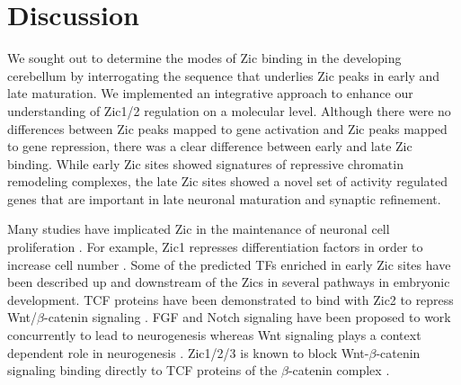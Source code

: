 \documentclass[fleqn,10pt]{wlscirep}
\begin{document}
\section*{Discussion}
We sought out to determine the modes of Zic binding in the developing cerebellum by interrogating the sequence that underlies Zic peaks in early and late maturation. We implemented an integrative approach to enhance our understanding of Zic1/2 regulation on a molecular level. Although there were no differences between Zic peaks mapped to gene activation and Zic peaks mapped to gene repression, there was a clear difference between early and late Zic binding. While early Zic sites showed signatures of repressive chromatin remodeling complexes, the late Zic sites showed a novel set of activity regulated genes that are important in late neuronal maturation and synaptic refinement. 



Many studies have implicated Zic in the maintenance of neuronal cell proliferation \cite{ Lim2007Zic3Cells, Janesick2013ERFNeurogenesis, Aruga2002Zic1Differentiation, Ebert2003Zic1Autoregulation }. For example, Zic1 represses differentiation factors in order to increase cell number \cite{Aruga2002Zic1Differentiation}. Some of the predicted TFs enriched in early Zic sites have been described up and downstream of the Zics in several pathways in embryonic development. TCF proteins have been demonstrated to bind with Zic2 to repress  Wnt/$\beta$-catenin signaling \cite{Aruga2018Zic1, Lowenstein2021Olig3Development}. FGF and Notch signaling have been proposed to work concurrently to lead to neurogenesis \cite{Voelkel2014FGFHierarchy} whereas Wnt signaling plays a context dependent role in neurogenesis \cite{Lassiter2014SignalingDelamination}. Zic1/2/3 is known to block Wnt-$\beta$-catenin signaling binding directly to TCF proteins of the $\beta$-catenin complex \cite{Ge2020Zic1Transition, Fujimi2012XenopusPathway, Murgan2015AtypicalPrecursors, Pourebrahim2011TranscriptionSignaling, Aruga2018ZicDisease,Aruga2018Zic1,Lowenstein2021Olig3Development}.  
\end{document}
